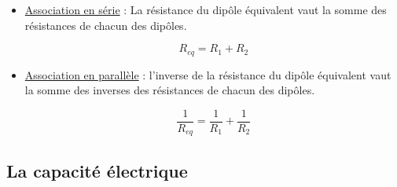 \begin{itemize}
\item \underline{Association en série} : La résistance du dipôle équivalent vaut la somme des résistances de chacun des dipôles. \\

\begin{center}
\begin{minipage}{.2\textwidth}
\begin{center}

\end{center}
\end{minipage}
\hspace{1cm}
\begin{minipage}{.3\textwidth} 
\begin{equation}
	R_{eq} = R_1 + R_2
\end{equation}
\end{minipage}
\end{center}

\vspace{0.5cm}

\item \underline{Association en parallèle} : l'inverse de la résistance du dipôle équivalent vaut la somme des inverses des résistances de chacun des dipôles. \\

\begin{center}
\begin{minipage}{.2\textwidth}
\begin{center}
	
\end{center}
\end{minipage}
\hspace{1cm}
\begin{minipage}{.3\textwidth} 
\begin{equation}
	\dfrac{1}{R_{eq}} = \dfrac{1}{R_1} + \dfrac{1}{R_2} 
\end{equation}
\end{minipage}
\end{center}
\end{itemize}

\subsection{La capacité électrique }

